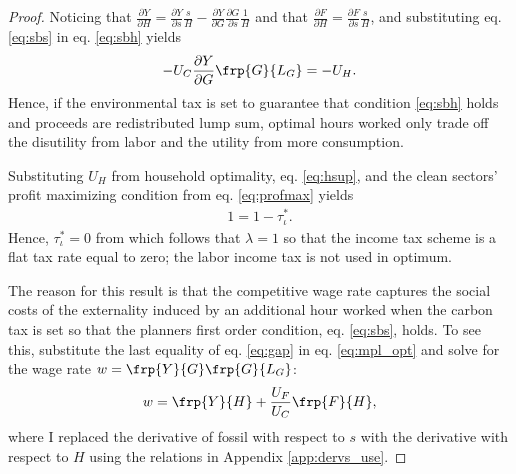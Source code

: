 \begin{proof}
Noticing that $\frac{\partial Y}{\partial H}= \frac{\partial Y}{\partial s}\frac{s}{H}-\frac{\partial Y}{\partial G}\frac{\partial G}{\partial s}\frac{1}{H}$ and that $\frac{\partial F}{\partial H}=\frac{\partial F}{\partial s}\frac{s}{H}$, and substituting eq. \eqref{eq:sbs} in eq. \eqref{eq:sbh} yields
\begin{align}\label{eq:pigou}
-U_C \frac{\partial Y}{\partial G}\frp{G}{L_G}=-U_H.
\end{align}
Hence, if the environmental tax is set to guarantee that condition \eqref{eq:sbh} holds and proceeds are redistributed lump sum, optimal hours worked only trade off the disutility from labor and the utility from more consumption. 

Substituting $U_H$ from household optimality, eq. \eqref{eq:hsup}, and the clean sectors' profit maximizing condition from eq. \eqref{eq:profmax} yields
\begin{align}
1=1-\tau^*_\iota.\nonumber
\end{align}
Hence, $\tau^*_\iota =0$ from which follows that $\lambda =1$ so that the income tax scheme is a flat tax rate equal to zero; the labor income tax is not used in optimum.


The reason for this result is that the competitive wage rate captures the social costs of the externality induced by an additional hour worked when the carbon tax is set so that the planners first order condition, eq. \eqref{eq:sbs}, holds. 
To see this, substitute the last equality of eq. \eqref{eq:gap}
in eq. \eqref{eq:mpl_opt} and solve for the wage rate $w= \frp{Y}{G}\frp{G}{L_G}$:
\begin{align}
w= \frp{Y}{H}+\frac{U_F}{U_C}\frp{F}{H},
\end{align}
where I replaced the derivative of fossil with respect to $s$ with the derivative with respect to $H$ using the relations in Appendix \ref{app:dervs_use}. 

\end{proof}
%
